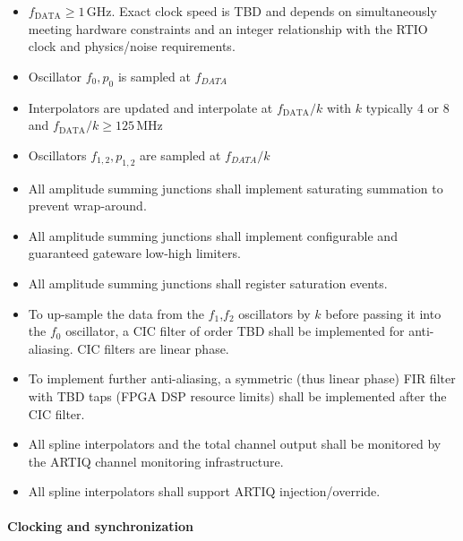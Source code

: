 \documentclass[11pt]{paper}
\begin{document}
\begin{itemize}
	\item $f_\mathrm{DATA}\geq1\,\mathrm{GHz}$. Exact clock speed is TBD and depends on simultaneously meeting hardware constraints and an integer relationship with the RTIO clock and physics/noise requirements.
	\item Oscillator $f_0,p_0$ is sampled at $f_{DATA}$
	\item Interpolators are updated and interpolate at $f_\mathrm{DATA}/k$ with $k$ typically 4 or 8 and $f_\mathrm{DATA}/k \geq 125\,\mathrm{MHz}$
	\item Oscillators $f_{1,2},p_{1,2}$ are sampled at $f_{DATA}/k$
	\item All amplitude summing junctions shall implement saturating summation to prevent wrap-around.
	\item All amplitude summing junctions shall implement configurable and guaranteed gateware low-high limiters.
	\item All amplitude summing junctions shall register saturation events.
	\item To up-sample the data from the $f_1$,$f_2$ oscillators by $k$ before passing it into the $f_0$ oscillator, a CIC filter of order TBD shall be implemented for anti-aliasing. CIC filters are linear phase.
	\item To implement further anti-aliasing, a symmetric (thus linear phase) FIR filter with TBD taps (FPGA DSP resource limits) shall be implemented after the CIC filter.
	\item All spline interpolators and the total channel output shall be monitored by the ARTIQ channel monitoring infrastructure.
	\item All spline interpolators shall support ARTIQ injection/override.
\end{itemize}

\paragraph{Clocking and synchronization}
\end{document}
